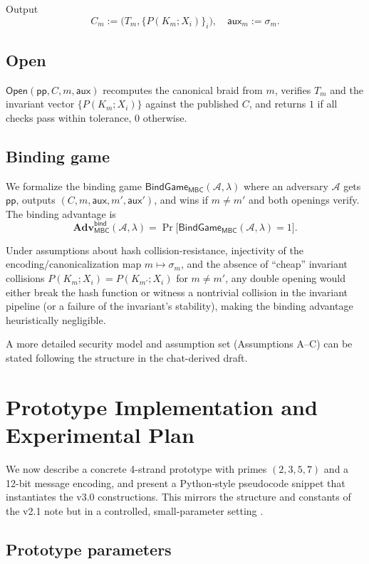 \documentclass[11pt]{article}
\begin{document}
Output
\[
  C_m := \big(T_m,\{P(K_m;X_i)\}_i\big), \quad \mathsf{aux}_m := \sigma_m.
\]

\subsection{Open}

$\mathsf{Open}(\mathsf{pp}, C, m, \mathsf{aux})$ recomputes the canonical braid from $m$, verifies $T_m$ and the invariant vector $\{P(K_m;X_i)\}$ against the published $C$, and returns $1$ if all checks pass within tolerance, $0$ otherwise.

\subsection{Binding game}

We formalize the binding game $\mathsf{BindGame}_{\mathsf{MBC}}(\mathcal{A},\lambda)$ where an adversary $\mathcal{A}$ gets $\mathsf{pp}$, outputs $(C,m,\mathsf{aux},m',\mathsf{aux}')$, and wins if $m\ne m'$ and both openings verify. The binding advantage is
\[
  \mathbf{Adv}^{\mathsf{bind}}_{\mathsf{MBC}}(\mathcal{A},\lambda) = \Pr\big[ \mathsf{BindGame}_{\mathsf{MBC}}(\mathcal{A},\lambda)=1\big].
\]

Under assumptions about hash collision-resistance, injectivity of the encoding/canonicalization map $m\mapsto \sigma_m$, and the absence of ``cheap'' invariant collisions $P(K_m;X_i) = P(K_{m'};X_i)$ for $m\ne m'$, any double opening would either break the hash function or witness a nontrivial collision in the invariant pipeline (or a failure of the invariant's stability), making the binding advantage heuristically negligible.

A more detailed security model and assumption set (Assumptions A--C) can be stated following the structure in the chat-derived draft.

\section{Prototype Implementation and Experimental Plan}
\label{sec:prototype}

We now describe a concrete 4-strand prototype with primes $(2,3,5,7)$ and a 12-bit message encoding, and present a Python-style pseudocode snippet that instantiates the v3.0 constructions. This mirrors the structure and constants of the v2.1 note but in a controlled, small-parameter setting \cite[Table~2]{MTv21}.

\subsection{Prototype parameters}
\end{document}
